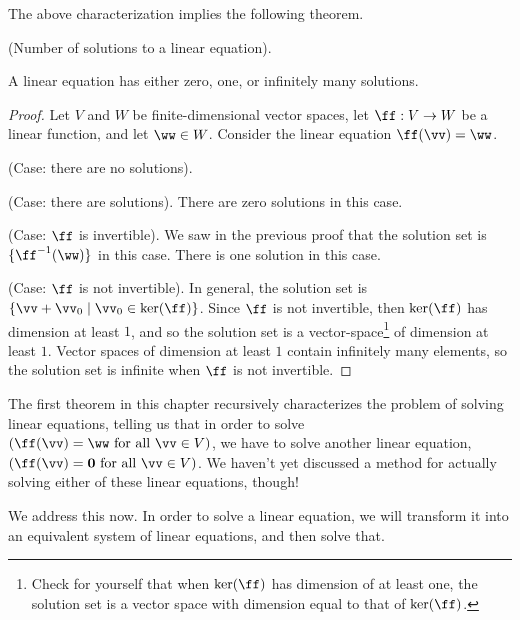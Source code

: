 The above characterization implies the following theorem.

\newpage

\begin{theorem}
    (Number of solutions to a linear equation).

    A linear equation has either zero, one, or infinitely many solutions.
\end{theorem}

\begin{proof}
    Let $V$ and $W$ be finite-dimensional vector spaces, let $\ff:V \rightarrow W$ be a linear function, and let $\ww \in W$. Consider the linear equation $\ff(\vv) = \ww$.

    (Case: there are no solutions).

    (Case: there are solutions). There are zero solutions in this case. 
    
    \indent \indent (Case: $\ff$ is invertible). We saw in the previous proof that the solution set is $\{\ff^{-1}(\ww)\}$ in this case. There is one solution in this case.

    \indent \indent (Case: $\ff$ is not invertible). In general, the solution set is $\{\vv + \vv_0 \mid \vv_0 \in \ker(\ff)\}$. Since $\ff$ is not invertible, then $\ker(\ff)$ has dimension at least $1$, and so the solution set is a vector-space\footnote{Check for yourself that when $\ker(\ff)$ has dimension of at least one, the solution set is a vector space with dimension equal to that of $\ker(\ff)$.} of dimension at least $1$. Vector spaces of dimension at least $1$ contain infinitely many elements, so the solution set is infinite when $\ff$ is not invertible.
\end{proof}

The first theorem in this chapter recursively characterizes the problem of solving linear equations, telling us that in order to solve $(\ff(\vv) = \ww \text{ for all $\vv \in V$})$, we have to solve another linear equation, $(\ff(\vv) = \mathbf{0} \text{ for all $\vv \in V$})$. We haven't yet discussed a method for actually solving either of these linear equations, though!

We address this now. In order to solve a linear equation, we will transform it into an equivalent system of linear equations, and then solve that.

